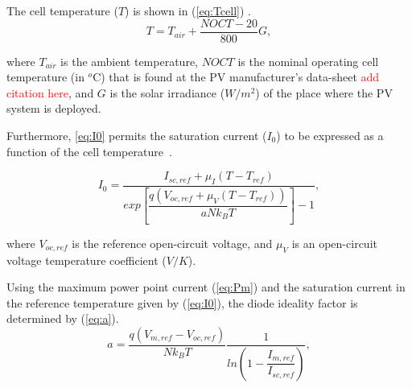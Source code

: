 \documentclass[journal]{IEEEtran}
\begin{document}
The cell temperature ($ T $) is shown in (\ref{eq:Tcell}) \cite{Ross}.
\begin{equation}
\label{eq:Tcell}
T = T_{air} + \dfrac{NOCT-20}{800}G,
\end{equation}

\noindent where $ T_{air} $ is the ambient temperature, $NOCT$ is the nominal operating cell temperature (in $^{o}$C) that is found at the PV manufacturer's data-sheet \textcolor{red}{add citation here}, and $G$ is the solar irradiance ($ W/m^{2} $) of the place where the PV system is deployed.

Furthermore, \eqref{eq:I0} permits the saturation current ($ I_{0} $) to be expressed as a function of the cell temperature~\cite{Villalva}. 

\begin{equation}
\label{eq:I0}
I_{0} = \dfrac{I_{sc,ref} + \mu_{I}(T - T_{ref})}{exp \left[ \dfrac{q(V_{oc,ref} + \mu_{V} (T - T_{ref}))}{aNk_{B}T}    \right] -1},
\end{equation}

\noindent where $ V_{oc,ref} $ is the reference open-circuit voltage, and $ \mu_{V} $ is an open-circuit voltage temperature coefficient ($ V/K $).

Using the maximum power point current (\ref{eq:Pm}) and the saturation current in the reference temperature given by (\ref{eq:I0}), the diode ideality factor is determined by (\ref{eq:a}).
\begin{equation}
\label{eq:a}
a = \dfrac{q(V_{m,ref}-V_{oc,ref})}{Nk_{B}T} \dfrac{1}{ln \left( 1 - \dfrac{I_{m,ref}}{I_{sc,ref}}  \right) },
\end{equation}
\end{document}
